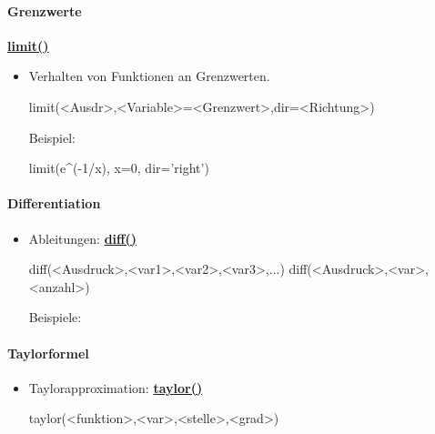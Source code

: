 \documentclass[a4paper,9pt,DIV15,twocolumn]{scrartcl}
\begin{document}
{\paragraph{Grenzwerte} \href{https://sage.math.uni-goettingen.de/doc/static/reference/calculus/sage/calculus/calculus.html#sage.calculus.calculus.limit}{\textbf{limit()}}
\begin{itemize}
 \item Verhalten von Funktionen an Grenzwerten.
 \begin{sageinsmall}
limit(<Ausdr>,<Variable>=<Grenzwert>,dir=<Richtung>)
\end{sageinsmall}
Beispiel:
 \begin{sageinsmall}
limit(e^(-1/x), x=0, dir='right')
 \end{sageinsmall}
 \end{itemize}
 
\paragraph{Differentiation}
\begin{itemize}
 \item Ableitungen: \href{https://sage.math.uni-goettingen.de/doc/static/reference/sage/calculus/functional.html?highlight=diff#sage.calculus.functional.diff}{\textbf{diff()}}
\begin{sageinsmall}
diff(<Ausdruck>,<var1>,<var2>,<var3>,...)
diff(<Ausdruck>,<var>,<anzahl>) 
\end{sageinsmall}
Beispiele:
\end{itemize}

\paragraph{Taylorformel}
\begin{itemize}
 \item Taylorapproximation: \href{https://sage.math.uni-goettingen.de/doc/static/reference/sage/calculus/functional.html?highlight=diff#sage.calculus.functional.integral}{\textbf{taylor()}}

\begin{sageinsmall}
taylor(<funktion>,<var>,<stelle>,<grad>)
\end{sageinsmall}
\end{itemize}
}
\end{document}
